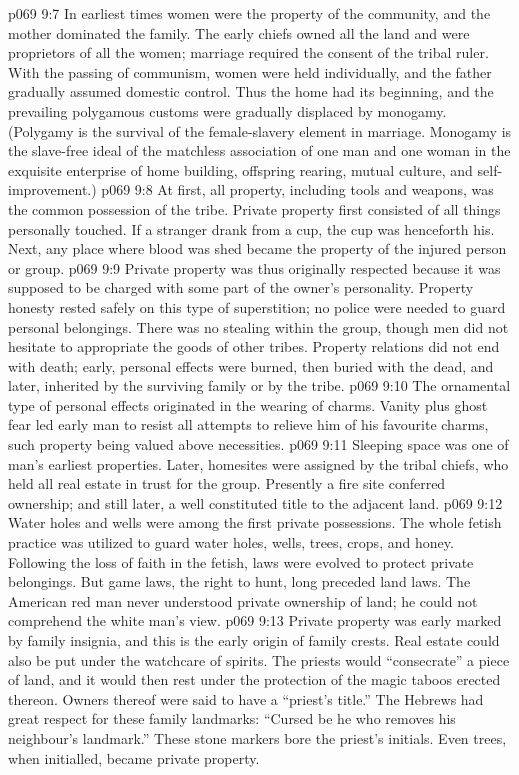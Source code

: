 \vs p069 9:7 In earliest times women were the property of the community, and the mother dominated the family. The early chiefs owned all the land and were proprietors of all the women; marriage required the consent of the tribal ruler. With the passing of communism, women were held individually, and the father gradually assumed domestic control. Thus the home had its beginning, and the prevailing polygamous customs were gradually displaced by monogamy. (Polygamy is the survival of the female\hyp{}slavery element in marriage. Monogamy is the slave\hyp{}free ideal of the matchless association of one man and one woman in the exquisite enterprise of home building, offspring rearing, mutual culture, and self\hyp{}improvement.)
\vs p069 9:8 At first, all property, including tools and weapons, was the common possession of the tribe. Private property first consisted of all things personally touched. If a stranger drank from a cup, the cup was henceforth his. Next, any place where blood was shed became the property of the injured person or group.
\vs p069 9:9 Private property was thus originally respected because it was supposed to be charged with some part of the owner’s personality. Property honesty rested safely on this type of superstition; no police were needed to guard personal belongings. There was no stealing within the group, though men did not hesitate to appropriate the goods of other tribes. Property relations did not end with death; early, personal effects were burned, then buried with the dead, and later, inherited by the surviving family or by the tribe.
\vs p069 9:10 The ornamental type of personal effects originated in the wearing of charms. Vanity plus ghost fear led early man to resist all attempts to relieve him of his favourite charms, such property being valued above necessities.
\vs p069 9:11 \pc Sleeping space was one of man’s earliest properties. Later, homesites were assigned by the tribal chiefs, who held all real estate in trust for the group. Presently a fire site conferred ownership; and still later, a well constituted title to the adjacent land.
\vs p069 9:12 Water holes and wells were among the first private possessions. The whole fetish practice was utilized to guard water holes, wells, trees, crops, and honey. Following the loss of faith in the fetish, laws were evolved to protect private belongings. But game laws, the right to hunt, long preceded land laws. The American red man never understood private ownership of land; he could not comprehend the white man’s view.
\vs p069 9:13 Private property was early marked by family insignia, and this is the early origin of family crests. Real estate could also be put under the watchcare of spirits. The priests would “consecrate” a piece of land, and it would then rest under the protection of the magic taboos erected thereon. Owners thereof were said to have a “priest’s title.” The Hebrews had great respect for these family landmarks: “Cursed be he who removes his neighbour’s landmark.” These stone markers bore the priest’s initials. Even trees, when initialled, became private property.
